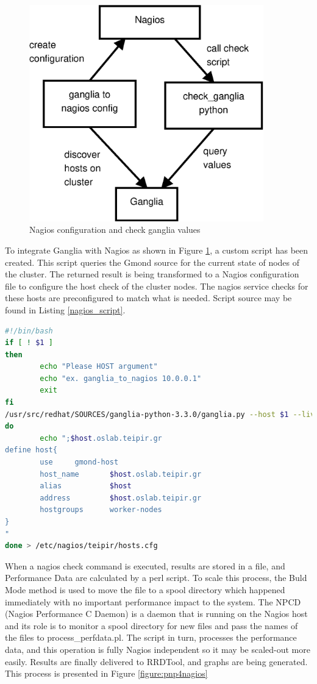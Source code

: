 \begin{figure}[htb]
\centering
 \includegraphics[width=4in]{images/nagios_check_ganglia.eps}
\caption{Nagios configuration and check ganglia values}
\label{figure:nagios_ganglia}
\end{figure}

To integrate Ganglia with Nagios as shown in Figure \ref{figure:nagios_ganglia}, a custom script has been created. This script queries the Gmond source for the current state of nodes of the cluster. The returned result is being transformed to a Nagios configuration file to configure the host check of the cluster nodes. The nagios service checks for these hosts are preconfigured to match what is needed. Script source may be found in Listing \ref{nagios_script}.

\begin{lstlisting}[language=bash,caption=Ganglia to Nagios script,label=nagios_script]
#!/bin/bash
if [ ! $1 ]
then
        echo "Please HOST argument"
        echo "ex. ganglia_to_nagios 10.0.0.1"
        exit
fi
/usr/src/redhat/SOURCES/ganglia-python-3.3.0/ganglia.py --host $1 --live | while read host
do
        echo ";$host.oslab.teipir.gr
define host{
        use     gmond-host
        host_name       $host.oslab.teipir.gr
        alias           $host
        address         $host.oslab.teipir.gr
        hostgroups      worker-nodes
}
"
done > /etc/nagios/teipir/hosts.cfg
\end{lstlisting}

When a nagios check command is executed, results are stored in a file, and Performance Data are calculated by a perl script. To scale this process, the Buld Mode method is used to move the file to a spool directory which happened immediately with no important performance impact to the system. The NPCD (Nagios Performance C Daemon) is a daemon that is running on the Nagios host and its role is to monitor a spool directory for new files and pass the names of the files to process\_perfdata.pl. The script in turn, processes the performance data, and this operation is fully Nagios independent so it may be scaled-out more easily. Results are finally delivered to RRDTool, and graphs are being generated. This process is presented in Figure \ref{figure:pnp4nagios}

